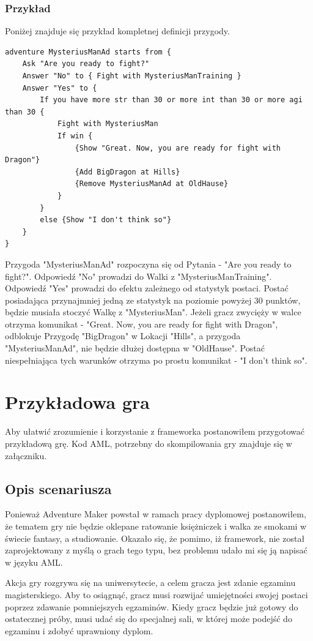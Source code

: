 \documentclass	{xmgr}
\begin{document}
\subsection{Przykład}
Poniżej znajduje się przykład kompletnej definicji przygody.
\begin{lstlisting}
adventure MysteriusManAd starts from {
	Ask "Are you ready to fight?"
	Answer "No" to { Fight with MysteriusManTraining }
	Answer "Yes" to {
		If you have more str than 30 or more int than 30 or more agi than 30 {
			Fight with MysteriusMan
			If win {
				{Show "Great. Now, you are ready for fight with Dragon"}
				{Add BigDragon at Hills}
				{Remove MysteriusManAd at OldHause}
			}
		}
		else {Show "I don't think so"}
	}
}
\end{lstlisting}
Przygoda "MysteriusManAd" rozpoczyna się od Pytania - "Are you ready to fight?". Odpowiedź "No" prowadzi do Walki z "MysteriusManTraining".
Odpowiedź "Yes" prowadzi do efektu zależnego od statystyk postaci. Postać posiadająca przynajmniej jedną ze statystyk na poziomie powyżej 30 punktów, będzie musiała stoczyć Walkę z "MysteriusMan". Jeżeli gracz zwycięży w walce otrzyma komunikat - "Great. Now, you are ready for fight with Dragon", odblokuje Przygodę "BigDragon" w Lokacji "Hills", a przygoda "MysteriusManAd", nie będzie dłużej dostępna w "OldHause". Postać niespełniająca tych warunków otrzyma po prostu komunikat - "I don't think so". 

\chapter{Przykładowa gra}
Aby ułatwić zrozumienie i korzystanie z frameworka postanowiłem przygotować przykładową grę. Kod AML, potrzebny do skompilowania gry znajduje się w załączniku.

\section{Opis scenariusza}

Ponieważ Adventure Maker powstał w ramach pracy dyplomowej postanowiłem, że tematem gry nie będzie oklepane ratowanie księżniczek i walka ze smokami w świecie fantasy, a studiowanie. Okazało się, że pomimo, iż framework, nie został zaprojektowany z myślą o grach tego typu, bez problemu udało mi się ją napisać w języku AML.

Akcja gry rozgrywa się na uniwersytecie, a celem gracza jest zdanie egzaminu magisterskiego. Aby to osiągnąć, gracz musi rozwijać umiejętności swojej postaci poprzez zdawanie pomniejszych egzaminów. Kiedy gracz będzie już gotowy do ostatecznej próby, musi udać się do specjalnej sali, w której może podejść do egzaminu i zdobyć uprawniony dyplom.
\end{document}
